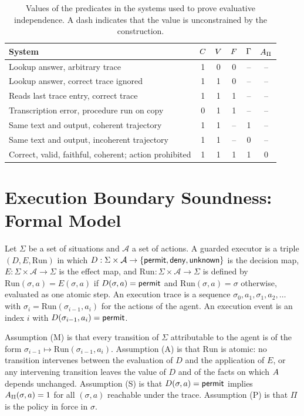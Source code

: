 \begin{table}[h]
\centering
\small
\renewcommand{\arraystretch}{1.2}
\begin{tabular}{p{5.3cm}ccccc}
\toprule
System & $C$ & $V$ & $F$ & $\Gamma$ & $A_\Pi$ \\
\midrule
Lookup answer, arbitrary trace & 1 & 0 & 0 & -- & -- \\
Lookup answer, correct trace ignored & 1 & 1 & 0 & -- & -- \\
Reads last trace entry, correct trace & 1 & 1 & 1 & -- & -- \\
Transcription error, procedure run on copy & 0 & 1 & 1 & -- & -- \\
Same text and output, coherent trajectory & 1 & 1 & -- & 1 & -- \\
Same text and output, incoherent trajectory & 1 & 1 & -- & 0 & -- \\
Correct, valid, faithful, coherent; action prohibited & 1 & 1 & 1 & 1 & 0 \\
\bottomrule
\end{tabular}
\caption{Values of the predicates in the systems used to prove evaluative independence. A dash indicates that the value is unconstrained by the construction.}
\end{table}

\chapter{Execution Boundary Soundness: Formal Model}
\label{app:soundness}

Let $\Sigma$ be a set of situations and $\mathcal A$ a set of actions. A guarded executor is a triple $(D,E,\mathrm{Run})$ in which $D:\Sigma\times\mathcal A\to\{\mathsf{permit},\mathsf{deny},\mathsf{unknown}\}$ is the decision map, $E:\Sigma\times\mathcal A\to\Sigma$ is the effect map, and $\mathrm{Run}:\Sigma\times\mathcal A\to\Sigma$ is defined by $\mathrm{Run}(\sigma,a)=E(\sigma,a)$ if $D(\sigma,a)=\mathsf{permit}$ and $\mathrm{Run}(\sigma,a)=\sigma$ otherwise, evaluated as one atomic step. An execution trace is a sequence $\sigma_0,a_1,\sigma_1,a_2,\dots$ with $\sigma_i=\mathrm{Run}(\sigma_{i-1},a_i)$ for the actions of the agent. An execution event is an index $i$ with $D(\sigma_{i-1},a_i)=\mathsf{permit}$.

Assumption (M) is that every transition of $\Sigma$ attributable to the agent is of the form $\sigma_{i-1}\mapsto\mathrm{Run}(\sigma_{i-1},a_i)$. Assumption (A) is that $\mathrm{Run}$ is atomic: no transition intervenes between the evaluation of $D$ and the application of $E$, or any intervening transition leaves the value of $D$ and of the facts on which $A$ depends unchanged. Assumption (S) is that $D(\sigma,a)=\mathsf{permit}$ implies $A_\Pi(\sigma,a)=1$ for all $(\sigma,a)$ reachable under the trace. Assumption (P) is that $\Pi$ is the policy in force in $\sigma$.

